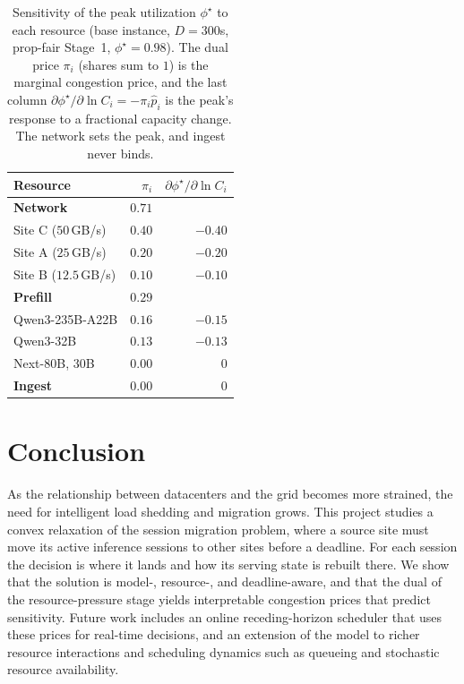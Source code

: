 \begin{table}[t]
\centering
\begin{tabular}{lrr}
\hline
Resource & $\pi_i$ & $\partial\phi^\star/\partial\ln C_i$ \\
\hline
\textbf{Network} & $0.71$ & \\
\quad Site C ($50$\,GB/s) & $0.40$ & $-0.40$ \\
\quad Site A ($25$\,GB/s) & $0.20$ & $-0.20$ \\
\quad Site B ($12.5$\,GB/s) & $0.10$ & $-0.10$ \\
\textbf{Prefill} & $0.29$ & \\
\quad Qwen3-235B-A22B & $0.16$ & $-0.15$ \\
\quad Qwen3-32B & $0.13$ & $-0.13$ \\
\quad Next-80B, 30B & $0.00$ & $0$ \\
\textbf{Ingest} & $0.00$ & $0$ \\
\hline
\end{tabular}
\caption{Sensitivity of the peak utilization $\phi^\star$ to each resource (base
instance, $D{=}300$s, prop-fair Stage~1, $\phi^\star{=}0.98$). The dual price $\pi_i$
(shares sum to $1$) is the marginal congestion price, and the last column
$\partial\phi^\star/\partial\ln C_i=-\pi_i\hat p_i$ is the peak's response to a
fractional capacity change. The network sets the peak, and ingest never binds.}
\label{tab:sens}
\end{table}

\section{Conclusion}

As the relationship between datacenters and the grid becomes more strained, the need for intelligent load shedding and migration grows. This project studies a convex relaxation of the session migration problem, where a source site must move its active inference sessions to other sites before a deadline. For each session the decision is where it lands and how its serving state is rebuilt there. We show that the solution is model-, resource-, and deadline-aware, and that the dual of the resource-pressure stage yields interpretable congestion prices that predict sensitivity. Future work includes an online receding-horizon scheduler that uses these prices for real-time decisions, and an extension of the model to richer resource interactions and scheduling dynamics such as queueing and stochastic resource availability.
